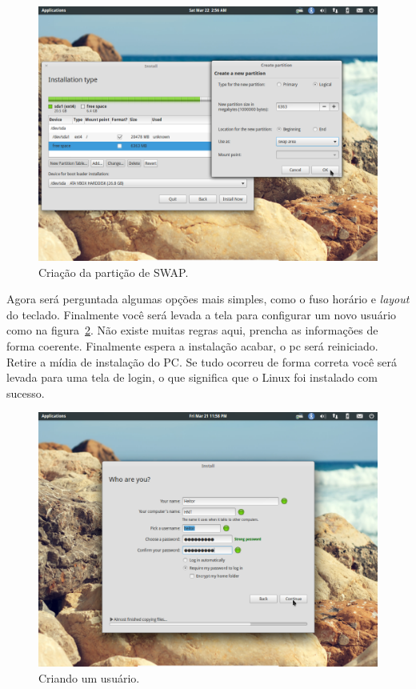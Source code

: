 \documentclass{handout_utfpr}
\begin{document}
\begin{figure}[H]
  \centering
  \includegraphics[scale=.3]{imagens/elementary-install-06.png}
  \caption{Criação da partição de SWAP.}
  \label{fig:elementary-swap}
\end{figure}

Agora será perguntada algumas opções mais simples, como o fuso horário e \emph{layout} do teclado. Finalmente você será levada a tela para configurar um novo usuário como na figura~\ref{fig:elementary-info}. Não existe muitas regras aqui, prencha as informações de forma coerente. Finalmente espera a instalação acabar, o pc será reiniciado. Retire a mídia de instalação do PC. Se tudo ocorreu de forma correta você será levada para uma tela de login, o que significa que o Linux foi instalado com sucesso.

\begin{figure}[H]
  \centering
  \includegraphics[scale=.3]{imagens/elementary-install-10.png}
  \caption{Criando um usuário.}
  \label{fig:elementary-info}
\end{figure}
\end{document}
